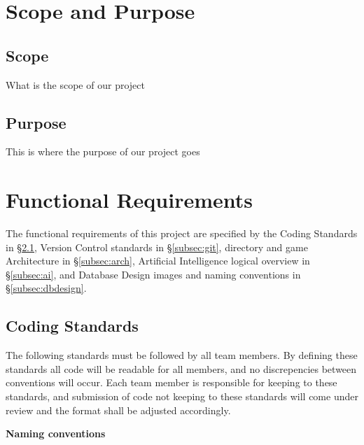 \documentclass[12pt]{IEEEtran}
\begin{document}
\section{Scope and Purpose}
\label{sec:scope}

\subsection{Scope}
\label{subsec:scope}

What is the scope of our project

\subsection{Purpose}
\label{subsec:purpose}

This is where the purpose of our project goes

\section{Functional Requirements}
\label{sec:funcReq}
	The functional requirements of this project are specified by the Coding Standards in \S \ref{subsec:coding}, Version Control standards in \S \ref{subsec:git}, directory and game Architecture in \S 				\ref{subsec:arch}, Artificial Intelligence logical overview in \S \ref{subsec:ai}, and Database Design images and naming conventions in \S \ref{subsec:dbdesign}.


\subsection{Coding Standards}
\label{subsec:coding}

	The following standards must be followed by all team members. By defining these standards all code will be readable for all members, and no discrepencies between conventions will occur. Each team member is 		responsible for keeping to these standards, and submission of code not keeping to these standards will come under review and the format shall be adjusted accordingly. 

	\bfseries Naming conventions \mdseries
\end{document}
